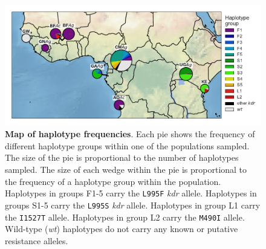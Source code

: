 \documentclass[a4paper,11pt,abstracton,hidelinks]{scrartcl}
\begin{document}
%
\begin{figure}[!t]
  \includegraphics[width=1.1\linewidth,center]{artwork/outbreak_map_base.pdf}
  \caption{\textbf{Map of haplotype frequencies}. Each pie shows the frequency of different haplotype groups within one of the populations sampled. The size of the pie is proportional to the number of haplotypes sampled. The size of each wedge within the pie is proportional to the frequency of a haplotype group within the population. Haplotypes in groups F1-5 carry the \texttt{L995F} \textit{kdr} allele. Haplotypes in groups S1-5 carry the \texttt{L995S} \textit{kdr} allele. Haplotypes in group L1 carry the \texttt{I1527T} allele. Haplotypes in group L2 carry the \texttt{M490I} allele. Wild-type (\textit{wt}) haplotypes do not carry any known or putative resistance alleles.}
  \label{fig:map}
\end{figure}
\end{document}
